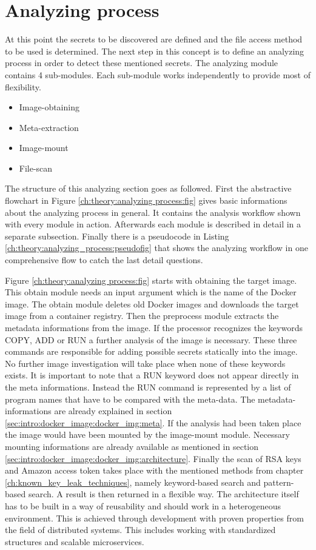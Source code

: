 \section{Analyzing process}
\label{ch:theory:analyzing_process}
At this point the secrets to be discovered are defined and the file access method to be used is determined. 
The next step in this concept is to define an analyzing process in order to detect these mentioned secrets.
The analyzing module contains 4 sub-modules.
Each sub-module works independently to provide most of flexibility.
\begin{itemize}
\item Image-obtaining
\item Meta-extraction
\item Image-mount
\item File-scan
\end{itemize}
The structure of this analyzing section goes as followed.
First the abstractive flowchart in Figure \ref{ch:theory:analyzing process:fig} gives basic informations about the analyzing process in general. 
It contains the analysis workflow shown with every module in action. 
Afterwards each module is described in detail in a separate subsection.
Finally there is a pseudocode in Listing \ref{ch:theory:analyzing_process:pseudofig} that shows the analyzing workflow in one comprehensive flow to catch the last detail questions.

Figure \ref{ch:theory:analyzing process:fig} starts with obtaining the target image. 
This obtain module needs an input argument which is the name of the Docker image.
The obtain module deletes old Docker images and downloads the target image from a container registry. 
Then the preprocess module extracts the metadata informations from the image. 
If the processor recognizes the keywords COPY, ADD or RUN a further analysis of the image is necessary.
These three commands are responsible for adding possible secrets statically into the image.
No further image investigation will take place when none of these keywords exists. 
It is important to note that a RUN keyword does not appear directly in the meta informations. 
Instead the RUN command is represented by a list of program names that have to be compared with the meta-data.
The metadata-informations are already explained in section \ref{sec:intro:docker_image:docker_img:meta}.
If the analysis had been taken place the image would have been mounted by the image-mount module.
Necessary mounting informations are already available as mentioned in section \ref{sec:intro:docker_image:docker_img:architecture}.
Finally the scan of RSA keys and Amazon access token takes place with the mentioned methods from chapter \ref{ch:known_key_leak_techniques}, namely keyword-based search and pattern-based search. A result is then returned in a flexible way.
The architecture itself has to be built in a way of reusability and should work in a heterogeneous environment.
This is achieved through development with proven properties from the field of distributed systems. 
This includes working with standardized structures and scalable microservices.

